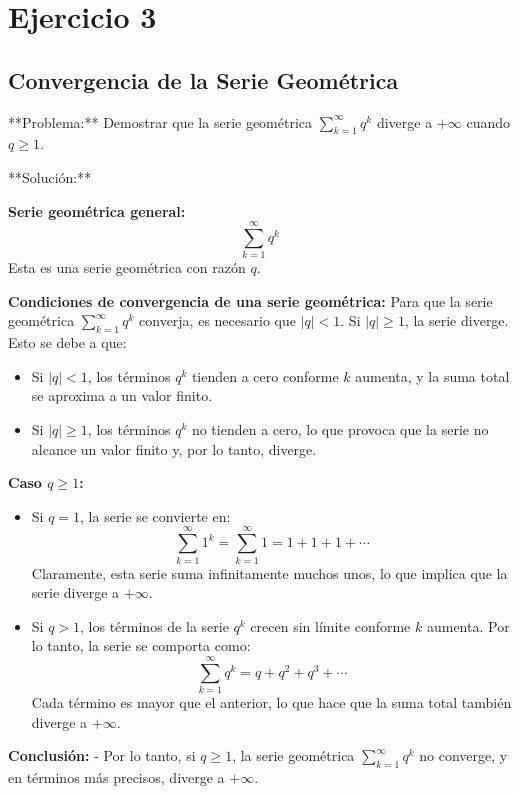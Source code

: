 \chapter*{Ejercicio 3}
\section*{Convergencia de la Serie Geométrica}

    **Problema:**
    Demostrar que la serie geométrica $\sum_{k=1}^{\infty} q^k$ diverge a $+\infty$ cuando $q \geq 1$.

    **Solución:**

    \textbf{Serie geométrica general:}
    \[
    \sum_{k=1}^{\infty} q^k
    \]
    Esta es una serie geométrica con razón \( q \).
 
    \textbf{Condiciones de convergencia de una serie geométrica:}
    Para que la serie geométrica \(\sum_{k=1}^{\infty} q^k\) converja, es necesario que \( |q| < 1 \). Si \( |q| \geq 1 \), la serie diverge. Esto se debe a que:
    \begin{itemize}
    \item Si \( |q| < 1 \), los términos \( q^k \) tienden a cero conforme \( k \) aumenta, y la suma total se aproxima a un valor finito.
    \item Si \( |q| \geq 1 \), los términos \( q^k \) no tienden a cero, lo que provoca que la serie no alcance un valor finito y, por lo tanto, diverge.
    \end{itemize}
 
    \textbf{Caso \( q \geq 1 \):}
    \begin{itemize}
    \item Si \( q = 1 \), la serie se convierte en:
      \[
      \sum_{k=1}^{\infty} 1^k = \sum_{k=1}^{\infty} 1 = 1 + 1 + 1 + \cdots
      \]
      Claramente, esta serie suma infinitamente muchos unos, lo que implica que la serie diverge a \( +\infty \).
    \item Si \( q > 1 \), los términos de la serie \( q^k \) crecen sin límite conforme \( k \) aumenta. Por lo tanto, la serie se comporta como:
      \[
      \sum_{k=1}^{\infty} q^k = q + q^2 + q^3 + \cdots
      \]
      Cada término es mayor que el anterior, lo que hace que la suma total también diverge a \( +\infty \).
    \end{itemize}
 
 \textbf{Conclusión:}
 - Por lo tanto, si \( q \geq 1 \), la serie geométrica \(\sum_{k=1}^{\infty} q^k\) no converge, y en términos más precisos, diverge a \( +\infty \).
 
